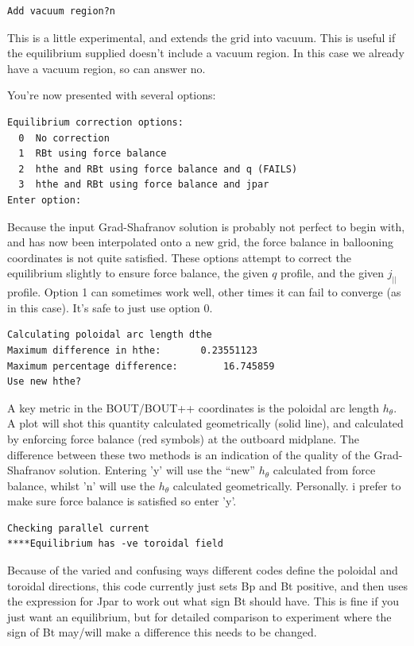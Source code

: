\documentclass[12pt]{article}
\begin{document}
%
\begin{verbatim}
Add vacuum region?n
\end{verbatim}
%
This is a little experimental, and extends the grid into vacuum. This is useful
if the equilibrium supplied doesn't include a vacuum region. In this case we
already have a vacuum region, so can answer no.

You're now presented with several options:
%
\begin{verbatim}
Equilibrium correction options:
  0  No correction
  1  RBt using force balance
  2  hthe and RBt using force balance and q (FAILS)
  3  hthe and RBt using force balance and jpar
Enter option:
\end{verbatim}
%
Because the input Grad-Shafranov solution is probably not perfect to begin
with, and has now been interpolated onto a new grid, the force balance in
ballooning coordinates is not quite satisfied. These options attempt to correct
the equilibrium slightly to ensure force balance, the given $q$ profile, and
the given $j_{||}$ profile. Option 1 can sometimes work well, other times it
can fail to converge (as in this case). It's safe to just use option 0.

%
\begin{verbatim}
Calculating poloidal arc length dthe
Maximum difference in hthe:       0.23551123
Maximum percentage difference:        16.745859
Use new hthe?
\end{verbatim}
%
A key metric in the BOUT/BOUT++ coordinates is the poloidal arc length
$h_\theta$. A plot will shot this quantity calculated geometrically (solid
line), and calculated by enforcing force balance (red symbols) at the outboard
midplane.  The difference between these two methods is an indication of the
quality of the Grad-Shafranov solution. Entering 'y' will use the ``new''
$h_\theta$ calculated from force balance, whilst 'n' will use the $h_\theta$
calculated geometrically.  Personally. i prefer to make sure force balance is
satisfied so enter 'y'.

%
\begin{verbatim}
Checking parallel current
****Equilibrium has -ve toroidal field
\end{verbatim}
%
Because of the varied and confusing ways different codes define the poloidal
and toroidal directions, this code currently just sets Bp and Bt positive, and
then uses the expression for Jpar to work out what sign Bt should have.  This
is fine if you just want an equilibrium, but for detailed comparison to
experiment where the sign of Bt may/will make a difference this needs to be
changed.
\end{document}
